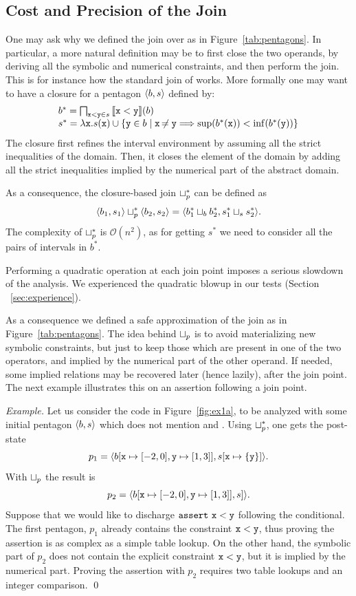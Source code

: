 \documentclass{elsart}
\begin{document}
\subsection{Cost and Precision of the Join}
One may ask why we defined the join over \Pentagons{} as in Figure~\ref{tab:pentagons}.
In particular, a more natural definition may be to first close the two operands, by deriving all the symbolic and numerical constraints, and then perform the join.
This is for instance how the standard join of \Octagons{} works.
More formally one may want to have a closure for a pentagon $\langle b,
  s \rangle$ defined by:
\[
\begin{array}{l}
b^* = \bigsqcap_{\mathtt{x} < \mathtt{y} \in s} \mathbb{}\llbracket \mathtt{\mathtt{x} < \mathtt{y}} \rrbracket(b) \\
s^* = \lambda \mathtt{x}. s(\mathtt{x}) \cup \{ \mathtt{y} \in b\mid \mathtt{x} \not\nobreak\mkern -2mu = \mathtt{y} \Longrightarrow \mathrm{sup}(b^*(\mathtt{x})) < \mathrm{inf}(b^*(\mathtt{y}))\} 
\end{array}
\]
The closure first refines  the interval environment by assuming all the strict inequalities of the \SUB{} domain.
Then, it closes the element of the \SUB{} domain by adding all the strict inequalities implied by the numerical part of the abstract domain.

As a consequence, the closure-based join $\sqcup_p^*$ can be defined as 
\[
\langle b_1, s_1 \rangle \sqcup_p^* \langle b_2, s_2 \rangle = \langle b_1^* \sqcup_b b_2^*, s_1^* \sqcup_s s_2^*  \rangle. 
\]
The complexity of $\sqcup_p^*$ is $\mathcal{O}(n^2)$, as for getting  $s^*$  we need to consider all the pairs of intervals in $b^*$.

Performing a quadratic operation at each join point imposes a serious slowdown of the analysis.
We experienced the quadratic blowup in our tests (Section ~\ref{sec:experience}).

As a consequence we defined a safe approximation of the join as in Figure~\ref{tab:pentagons}.
The idea behind $\sqcup_p$ is to avoid materializing new symbolic constraints, but just to keep those which are present in one of the two operators, and implied by the numerical part of the other operand.
If needed, some implied relations may be recovered later (hence lazily),
after the join point. The next example illustrates this on an
assertion following a join point.

\textit{Example.}
Let us consider the code in Figure~\ref{fig:ex1a}, to be analyzed with some initial pentagon $\langle b, s \rangle$ which does not mention  and .
Using $\sqcup_p^*$, one gets the post-state 
\[ 
p_1 = \langle b[\mathtt{x} \mapsto [-2, 0], \allowbreak \mathtt{y} \mapsto [1, 3]], \allowbreak s[\mathtt{x} \mapsto \{ \mathtt{y} \} ] \rangle.
\]
With $\sqcup_p$ the result is 
\[
p_2 = \langle b[\mathtt{x} \mapsto [-2, 0], \allowbreak \mathtt{y} \mapsto [1,3]], \allowbreak s] \rangle.
\]
Suppose that we would like to discharge $\mathtt{assert\ x < y}$ following the conditional.
The first pentagon, $p_1$ already contains the constraint $\mathtt{x} <
\mathtt{y}$, thus proving the assertion is as complex as a simple  table lookup.
On the other hand, the symbolic part of $p_2$ does not contain the
explicit constraint $\mathtt{x} < \mathtt{y}$, but it is implied by the
numerical part. Proving the assertion with $p_2$ requires two table lookups and an integer comparison. 
\qed
 
\end{document}
